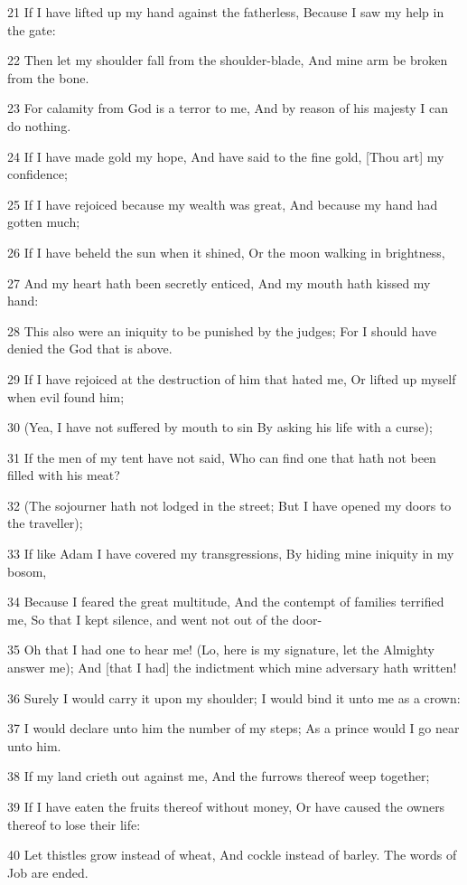 \par 21 If I have lifted up my hand against the fatherless, Because I saw my help in the gate:
\par 22 Then let my shoulder fall from the shoulder-blade, And mine arm be broken from the bone.
\par 23 For calamity from God is a terror to me, And by reason of his majesty I can do nothing.
\par 24 If I have made gold my hope, And have said to the fine gold, [Thou art] my confidence;
\par 25 If I have rejoiced because my wealth was great, And because my hand had gotten much;
\par 26 If I have beheld the sun when it shined, Or the moon walking in brightness,
\par 27 And my heart hath been secretly enticed, And my mouth hath kissed my hand:
\par 28 This also were an iniquity to be punished by the judges; For I should have denied the God that is above.
\par 29 If I have rejoiced at the destruction of him that hated me, Or lifted up myself when evil found him;
\par 30 (Yea, I have not suffered by mouth to sin By asking his life with a curse);
\par 31 If the men of my tent have not said, Who can find one that hath not been filled with his meat?
\par 32 (The sojourner hath not lodged in the street; But I have opened my doors to the traveller);
\par 33 If like Adam I have covered my transgressions, By hiding mine iniquity in my bosom,
\par 34 Because I feared the great multitude, And the contempt of families terrified me, So that I kept silence, and went not out of the door-
\par 35 Oh that I had one to hear me! (Lo, here is my signature, let the Almighty answer me); And [that I had] the indictment which mine adversary hath written!
\par 36 Surely I would carry it upon my shoulder; I would bind it unto me as a crown:
\par 37 I would declare unto him the number of my steps; As a prince would I go near unto him.
\par 38 If my land crieth out against me, And the furrows thereof weep together;
\par 39 If I have eaten the fruits thereof without money, Or have caused the owners thereof to lose their life:
\par 40 Let thistles grow instead of wheat, And cockle instead of barley. The words of Job are ended.

